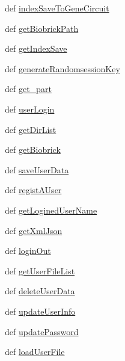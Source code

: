 \begin{DoxyCompactItemize}
\item 
def \hyperlink{classweb_1_1websocket_1_1apis_a15d8a9669330c0995a8f8f8f96d6c2ca}{index\-Save\-To\-Gene\-Circuit}
\item 
def \hyperlink{classweb_1_1websocket_1_1apis_a4fb8843f3f56c1fce8d5ec9958860db9}{get\-Biobrick\-Path}
\item 
def \hyperlink{classweb_1_1websocket_1_1apis_a3b798d7e73b5188a5d02174918beea7d}{get\-Index\-Save}
\item 
def \hyperlink{classweb_1_1websocket_1_1apis_ae532a18f40e7c6a6489d9fc124575e14}{generate\-Randomsession\-Key}
\item 
def \hyperlink{classweb_1_1websocket_1_1apis_aae4443505e0cd13fe52529c71e14d0bb}{get\-\_\-part}
\item 
def \hyperlink{classweb_1_1websocket_1_1apis_a30a11049dbfba2349732464c2476eb44}{user\-Login}
\item 
def \hyperlink{classweb_1_1websocket_1_1apis_a2b3b2feccb1d4a68dfd9026736846b4f}{get\-Dir\-List}
\item 
def \hyperlink{classweb_1_1websocket_1_1apis_aaa8be02d193479b1295c32b7f1b4943b}{get\-Biobrick}
\item 
def \hyperlink{classweb_1_1websocket_1_1apis_a78e1f0407fa3ec02c3541961bd009f42}{save\-User\-Data}
\item 
def \hyperlink{classweb_1_1websocket_1_1apis_acf6f7463345b6cd581ca8f6d562158ce}{regist\-A\-User}
\item 
def \hyperlink{classweb_1_1websocket_1_1apis_a83bb21a1d746bd18601fcc37e92cbbd6}{get\-Logined\-User\-Name}
\item 
def \hyperlink{classweb_1_1websocket_1_1apis_a2039344dab3ebf74945cd0826afc799d}{get\-Xml\-Json}
\item 
def \hyperlink{classweb_1_1websocket_1_1apis_aa673e5bc2f1532ab519a1ea711eccd0c}{login\-Out}
\item 
def \hyperlink{classweb_1_1websocket_1_1apis_a7ccc5ee831fa151d97942f71458d5b32}{get\-User\-File\-List}
\item 
def \hyperlink{classweb_1_1websocket_1_1apis_a4fb236bbf6c1e59f246225e92948beb2}{delete\-User\-Data}
\item 
def \hyperlink{classweb_1_1websocket_1_1apis_aa01f5f4f3895f58b51ada97b820f8523}{update\-User\-Info}
\item 
def \hyperlink{classweb_1_1websocket_1_1apis_a0613c1db2dd272ebc5afd3c02aa60600}{update\-Password}
\item 
def \hyperlink{classweb_1_1websocket_1_1apis_a05adcc07fe9c867b194e4c88780ae3eb}{load\-User\-File}

\end{DoxyCompactItemize}
